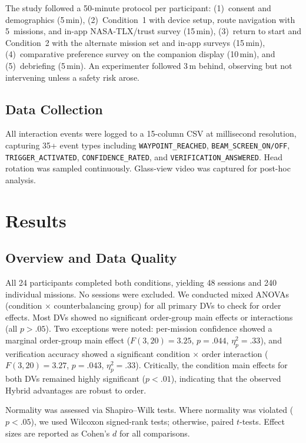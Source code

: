 \documentclass[review]{vgtc}           %
\begin{document}
The study followed a 50-minute protocol per participant:
(1)~consent and demographics (5\,min), (2)~Condition~1 with device
setup, route navigation with 5~missions, and in-app NASA-TLX/trust
survey (15\,min), (3)~return to start and Condition~2 with the
alternate mission set and in-app surveys (15\,min),
(4)~comparative preference survey on the companion display (10\,min),
and (5)~debriefing (5\,min). An experimenter followed 3\,m behind,
observing but not intervening unless a safety risk arose.

\subsection{Data Collection}

All interaction events were logged to a 15-column CSV at millisecond
resolution, capturing 35+ event types including
\texttt{WAYPOINT\_REACHED}, \texttt{BEAM\_SCREEN\_ON/OFF},
\texttt{TRIGGER\_ACTIVATED}, \texttt{CONFIDENCE\_RATED}, and
\texttt{VERIFICATION\_ANSWERED}. Head rotation was sampled
continuously. Glass-view video was captured for post-hoc analysis.



\section{Results}

\subsection{Overview and Data Quality}

All 24 participants completed both conditions, yielding 48 sessions
and 240 individual missions. No sessions were excluded. We conducted
mixed ANOVAs (condition $\times$ counterbalancing group) for all
primary DVs to check for order effects. Most DVs showed no significant
order-group main effects or interactions (all $p > .05$). Two
exceptions were noted: per-mission confidence showed a marginal
order-group main effect ($F(3,20) = 3.25$, $p = .044$,
$\eta^2_p = .33$), and verification accuracy showed a significant
condition $\times$ order interaction ($F(3,20) = 3.27$, $p = .043$,
$\eta^2_p = .33$). Critically, the condition main effects for both DVs
remained highly significant ($p < .01$), indicating that the observed
Hybrid advantages are robust to order.

Normality was assessed via Shapiro--Wilk tests. Where normality was
violated ($p < .05$), we used Wilcoxon signed-rank tests; otherwise,
paired $t$-tests. Effect sizes are reported as Cohen's $d$ for all
comparisons.
\end{document}
